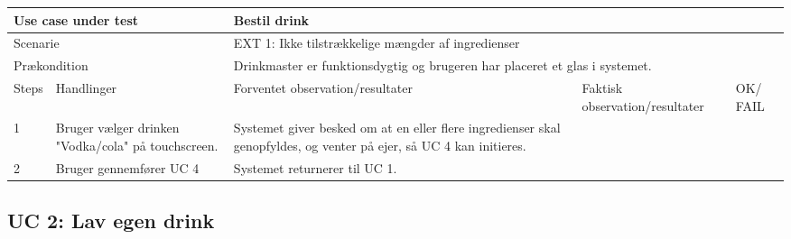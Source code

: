 \begin{table}[H]
\begin{tabular}{|p{1cm}|p{4cm}|p{4cm}|p{4cm}|p{1cm}|}
\hline
\multicolumn{2}{|p{5cm}|}{Use case under test} & \multicolumn{3}{p{9cm}|}{Bestil drink}                                       \\ \hline
\multicolumn{2}{|p{5cm}|}{Scenarie}            & \multicolumn{3}{p{9cm}|}{EXT 1: Ikke tilstrækkelige mængder af ingredienser}                                          \\ \hline
\multicolumn{2}{|p{5cm}|}{Prækondition}        & \multicolumn{3}{p{9cm}|}{Drinkmaster er funktionsdygtig og brugeren har placeret et glas i systemet.}                                 \\ \hline
Steps               & Handlinger          & Forventet observation/resultater & Faktisk observation/resultater & OK/ FAIL \\ \hline
1    & Bruger vælger drinken "Vodka/cola" på touchscreen.  & Systemet giver besked om at en eller flere ingredienser skal genopfyldes, og venter på ejer, så UC 4 kan initieres. &   &      \\ \hline
2    & Bruger gennemfører UC 4  & Systemet returnerer til UC 1. &   &         \\ \hline

\end{tabular}
\end{table}

\subsection{UC 2: Lav egen drink}

